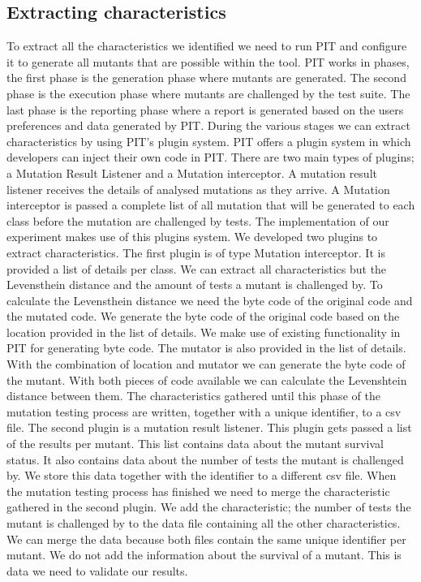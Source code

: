 \documentclass[../main]{subfiles}
\begin{document}
\subsection{Extracting characteristics}
To extract all the characteristics we identified we need to run PIT and configure it to generate all mutants that are possible within the tool. 
PIT works in phases, the first phase is the generation phase where mutants are generated.
The second phase is the execution phase where mutants are challenged by the test suite.
The last phase is the reporting phase where a report is generated based on the users preferences and data generated by PIT.
During the various stages we can extract characteristics by using PIT's plugin system.
\newline
PIT offers a plugin system in which developers can inject their own code in PIT\cite{pitestPlugin}.
There are two main types of plugins; a Mutation Result Listener and a Mutation interceptor\cite{pitestPlugin}.
A mutation result listener receives the details of analysed mutations as they arrive\cite{pitestPlugin}.
A Mutation interceptor is passed a complete list of all mutation that will be generated to each class before the mutation are challenged by tests\cite{pitestPlugin}.
The implementation of our experiment makes use of this plugins system.
\newline
We developed two plugins to extract characteristics.
The first plugin is of type Mutation interceptor.
It is provided a list of details per class. 
We can extract all characteristics but the Levensthein distance and the amount of tests a mutant is challenged by.
To calculate the Levensthein distance we need the byte code of the original code and the mutated code.
We generate the byte code of the original code based on the location provided in the list of details.
We make use of existing functionality in PIT for generating byte code.
The mutator is also provided in the list of details.
With the combination of location and mutator we can generate the byte code of the mutant.
With both pieces of code available we can calculate the Levenshtein distance between them.
\newline
The characteristics gathered until this phase of the mutation testing process are written, together with a unique identifier, to a \acrshort{csv} file.
\newline
The second plugin is a mutation result listener. 
This plugin gets passed a list of the results per mutant.
This list contains data about the mutant survival status.
It also contains data about the number of tests the mutant is challenged by.
We store this data together with the identifier to a different \acrshort{csv} file.
\newline
When the mutation testing process has finished we need to merge the characteristic gathered in the second plugin.
We add the characteristic; the number of tests the mutant is challenged by to the data file containing all the other characteristics.
We can merge the data because both files contain the same unique identifier per mutant.
We do not add the information about the survival of a mutant.
This is data we need to validate our results. 
\end{document}
